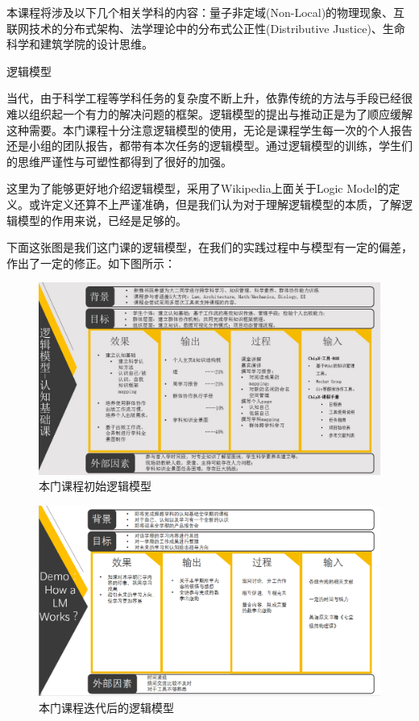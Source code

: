\documentclass[11pt,fleqn]{book}
\makeatletter
\numberwithin{dummy}{section}
\theoremstyle{ocrenumbox}
\theoremstyle{blacknumex}
\theoremstyle{blacknumbox}
\theoremstyle{ocrenum}
\renewcommand{\section}{\@startsection{section}{1}{\z@}
	{-4ex \@plus -1ex \@minus -.4ex}
	{1ex \@plus.2ex }
	{\normalfont\large\sffamily\bfseries}}
\makeatother
\begin{document}
本课程将涉及以下几个相关学科的内容：量子非定域(Non-Local)的物理现象、互联网技术的分布式架构、法学理论中的分布式公正性(Distributive Justice)、生命科学和建筑学院的设计思维。

\section{逻辑模型}

当代，由于科学工程等学科任务的复杂度不断上升，依靠传统的方法与手段已经很难以组织起一个有力的解决问题的框架。逻辑模型的提出与推动正是为了顺应缓解这种需要。本门课程十分注意逻辑模型的使用，无论是课程学生每一次的个人报告还是小组的团队报告，都带有本次任务的逻辑模型。通过逻辑模型的训练，学生们的思维严谨性与可塑性都得到了很好的加强。

这里为了能够更好地介绍逻辑模型，采用了Wikipedia上面关于Logic Model的定义。或许定义还算不上严谨准确，但是我们认为对于理解逻辑模型的本质，了解逻辑模型的作用来说，已经是足够的。

下面这张图是我们这门课的逻辑模型，在我们的实践过程中与模型有一定的偏差，作出了一定的修正。如下图所示：

\begin{figure}[h]
	\centering\includegraphics[width=15cm]{1.jpg}
	\caption{本门课程初始逻辑模型}
\end{figure}

\begin{figure}[h]
	\centering\includegraphics[width=15cm]{12.png}
	\caption{本门课程迭代后的逻辑模型}
\end{figure}
\end{document}
